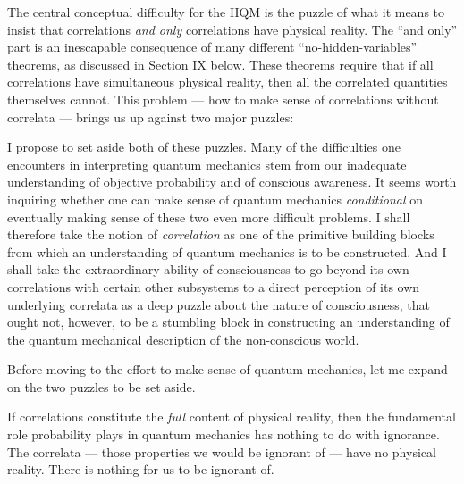 The central conceptual difficulty for the IIQM is
the puzzle of what it means to insist that correlations {\it and
only\/} correlations have physical reality.  The ``and only'' part is
an inescapable consequence of many different ``no-hidden-variables''
theorems, as discussed in Section IX below.  These theorems require
that if all correlations have simultaneous physical reality, then all
the correlated quantities themselves cannot.  This problem --- how to
make sense of correlations without correlata --- brings us up against
two major puzzles: 

\medskip



\noindent
I propose to set aside both of these puzzles.  Many of the
difficulties one encounters in interpreting quantum mechanics stem
from our inadequate understanding of objective probability and of
conscious awareness.  It seems worth inquiring whether one can make
sense of quantum mechanics {\it conditional\/} on eventually making
sense of these two even more difficult problems.  I shall therefore
take the notion of {\it correlation\/} as one of the primitive
building blocks from which an understanding of quantum mechanics is to
be constructed.  And I shall take the extraordinary ability of
consciousness to go beyond its own correlations with certain other
subsystems to a direct perception of its own underlying correlata as a
deep puzzle about the nature of consciousness, that ought not,
however, to be a stumbling block in constructing an understanding of
the quantum mechanical description of the non-conscious world.

Before moving to the effort to make sense of quantum mechanics, let me
expand on the two puzzles to be set aside.

\bigskip{}\nobreak\medskip\nobreak If correlations constitute the {\it
full\/} content of physical reality, then the fundamental role
probability plays in quantum mechanics has nothing to do with
ignorance.  The correlata --- those properties we would be ignorant of
--- have no physical reality.  There is nothing for us to be ignorant
of.  

